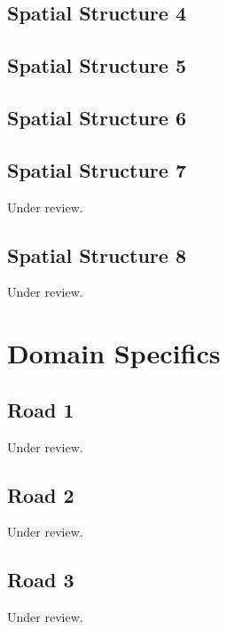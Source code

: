 \documentclass{scrartcl}
\begin{document}
\subsection{Spatial Structure 4}
\label{sec:spatial_4}
\clearpage

\subsection{Spatial Structure 5}
\label{sec:spatial_5}
\clearpage

\subsection{Spatial Structure 6}
\label{sec:spatial_6}
\clearpage

\subsection{Spatial Structure 7} %
\label{sec:spatial_7}
Under review.%
\clearpage

\subsection{Spatial Structure 8} %
\label{sec:spatial_8}
Under review.%
\clearpage

\section{Domain Specifics}

\subsection{Road 1}  %
\label{sec:road_1}
Under review.%
\clearpage

\subsection{Road 2} %
\label{sec:road_2}
Under review.%
\clearpage

\subsection{Road 3} %
\label{sec:road_3}
Under review.%
\clearpage
\end{document}
